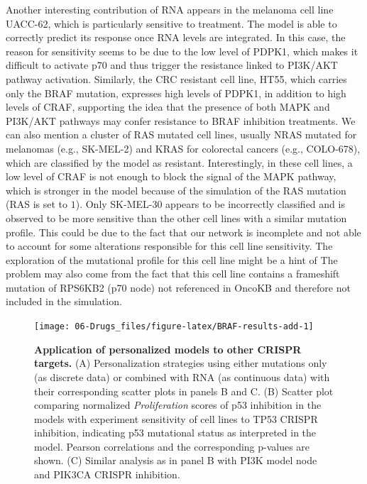 \documentclass[a4paper,12pt,twoside,onecolumn,openright,final,oldfontcommands]{memoir}
\begin{document}
Another interesting contribution of RNA appears in the melanoma cell
line UACC-62, which is particularly sensitive to treatment. The model is
able to correctly predict its response once RNA levels are integrated.
In this case, the reason for sensitivity seems to be due to the low
level of PDPK1, which makes it difficult to activate p70 and thus
trigger the resistance linked to PI3K/AKT pathway activation. Similarly,
the CRC resistant cell line, HT55, which carries only the BRAF mutation,
expresses high levels of PDPK1, in addition to high levels of CRAF,
supporting the idea that the presence of both MAPK and PI3K/AKT pathways
may confer resistance to BRAF inhibition treatments. We can also mention
a cluster of RAS mutated cell lines, usually NRAS mutated for melanomas
(e.g., SK-MEL-2) and KRAS for colorectal cancers (e.g., COLO-678), which
are classified by the model as resistant. Interestingly, in these cell
lines, a low level of CRAF is not enough to block the signal of the MAPK
pathway, which is stronger in the model because of the simulation of the
RAS mutation (RAS is set to \(1\)). Only SK-MEL-30 appears to be
incorrectly classified and is observed to be more sensitive than the
other cell lines with a similar mutation profile. This could be due to
the fact that our network is incomplete and not able to account for some
alterations responsible for this cell line sensitivity. The exploration
of the mutational profile for this cell line might be a hint of The
problem may also come from the fact that this cell line contains a
frameshift mutation of RPS6KB2 (p70 node) not referenced in OncoKB and
therefore not included in the simulation.

\begin{figure}

{\centering \texttt{[image: 06-Drugs\_files/figure-latex/BRAF-results-add-1]} 

}

\caption[Application of personalized models to other CRISPR targets]{\textbf{Application of personalized
models to other CRISPR targets.} (A) Personalization strategies using
either mutations only (as discrete data) or combined with RNA (as
continuous data) with their corresponding scatter plots in panels B and
C. (B) Scatter plot comparing normalized \emph{Proliferation} scores of
p53 inhibition in the models with experiment sensitivity of cell lines
to TP53 CRISPR inhibition, indicating p53 mutational status as
interpreted in the model. Pearson correlations and the corresponding
p-values are shown. (C) Similar analysis as in panel B with PI3K model
node and PIK3CA CRISPR inhibition.}\label{fig:BRAF-results-add}
\end{figure}
\end{document}
